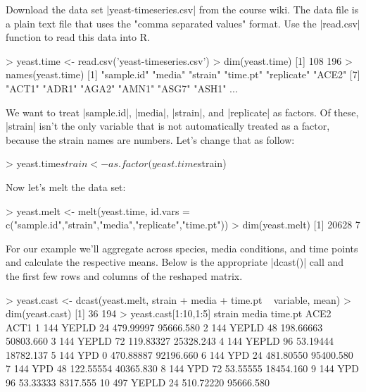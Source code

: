 Download the data set |yeast-timeseries.csv| from the course wiki. The data file is a plain text file that uses the "comma separated values" format. Use the |read.csv| function to read this data into R.
%
\begin{R}
> yeast.time <- read.csv('yeast-timeseries.csv')
> dim(yeast.time)
[1] 108 196
> names(yeast.time)
  [1] "sample.id"  "media"      "strain"     "time.pt"    "replicate"  "ACE2"      
  [7] "ACT1"       "ADR1"       "AGA2"       "AMN1"       "ASG7"       "ASH1" 
...
\end{R}

We want to treat |sample.id|, |media|, |strain|, and |replicate| as factors.   Of these, |strain| isn't the only variable that is not automatically treated as a factor, because the strain names are numbers. Let's change that as follow:
%
\begin{R}
> yeast.time$strain <- as.factor(yeast.time$strain)
\end{R}
%

Now let's melt the data set:
%
\begin{R}
> yeast.melt <- melt(yeast.time, 
        id.vars = c("sample.id","strain","media","replicate","time.pt"))
> dim(yeast.melt)
[1] 20628     7
\end{R}
%
For our example we'll aggregate across species, media conditions, and time points and calculate the respective means.  Below is the appropriate |dcast()| call and the first few rows and columns of the reshaped matrix.
%
\begin{R}
> yeast.cast <- dcast(yeast.melt, strain + media + time.pt ~ variable, mean)
> dim(yeast.cast)
[1]  36 194
> yeast.cast[1:10,1:5]
   strain media time.pt      ACE2      ACT1
1     144 YEPLD      24 479.99997 95666.580
2     144 YEPLD      48 198.66663 50803.660
3     144 YEPLD      72 119.83327 25328.243
4     144 YEPLD      96  53.19444 18782.137
5     144   YPD       0 470.88887 92196.660
6     144   YPD      24 481.80550 95400.580
7     144   YPD      48 122.55554 40365.830
8     144   YPD      72  53.55555 18454.160
9     144   YPD      96  53.33333  8317.555
10    497 YEPLD      24 510.72220 95666.580
\end{R}

